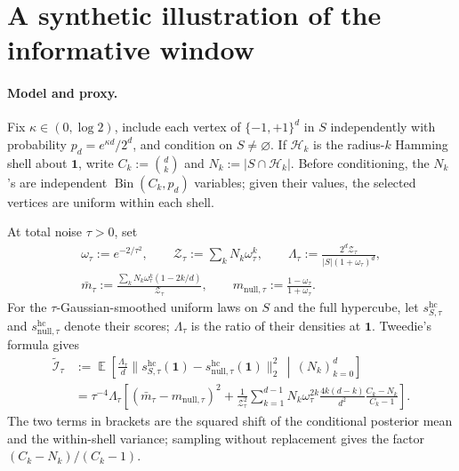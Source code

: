 \documentclass[11pt,letterpaper]{article}
\DeclareMathOperator*{\E}{\mathbb{E}}
\newcommand{\1}{\mathbbm{1}}
\begin{document}
\section{A synthetic illustration of the informative window}
\label{app:synthetic}

\paragraph{Model and proxy.}
Fix \(\kappa\in(0,\log2)\), include each vertex of \(\{-1,+1\}^d\)
in \(S\) independently with probability \(p_d=e^{\kappa d}/2^d\),
and condition on \(S\ne\varnothing\).  If \(\mathcal H_k\) is the
radius-\(k\) Hamming shell about \(\mathbf1\), write
\(C_k:=\binom dk\) and \(N_k:=|S\cap\mathcal H_k|\).
Before conditioning, the \(N_k\)'s are independent
\(\operatorname{Bin}(C_k,p_d)\) variables; given their values, the
selected vertices are uniform within each shell.

At total noise \(\tau>0\), set
\[
\begin{gathered}
   \omega_\tau:=e^{-2/\tau^2},\qquad
   \mathcal Z_\tau:=\sum_kN_k\omega_\tau^k,\qquad
   \Lambda_\tau:=
   \frac{2^d\mathcal Z_\tau}{|S|(1+\omega_\tau)^d},\\
   \bar m_\tau:=
   \frac{\sum_kN_k\omega_\tau^k(1-2k/d)}{\mathcal Z_\tau},
   \qquad
   m_{\mathrm{null},\tau}:=\frac{1-\omega_\tau}{1+\omega_\tau}.
\end{gathered}
\]
For the \(\tau\)-Gaussian-smoothed uniform laws on \(S\) and the full
hypercube, let \(s^{\mathrm{hc}}_{S,\tau}\) and
\(s^{\mathrm{hc}}_{\mathrm{null},\tau}\) denote their scores;
\(\Lambda_\tau\) is the ratio of their densities at \(\mathbf1\).
Tweedie's formula gives
\[
\begin{aligned}
   \widetilde{\mathcal I}_\tau
   &:=\E\!\left[
      \frac{\Lambda_\tau}{d}
      \|s^{\mathrm{hc}}_{S,\tau}(\mathbf 1)
        -s^{\mathrm{hc}}_{\mathrm{null},\tau}(\mathbf 1)\|_2^2
      \,\middle|\,(N_k)_{k=0}^d\right]\\
   &=\tau^{-4}\Lambda_\tau\left[
      (\bar m_\tau-m_{\mathrm{null},\tau})^2
      +\frac1{\mathcal Z_\tau^2}
       \sum_{k=1}^{d-1}N_k\omega_\tau^{2k}
       \frac{4k(d-k)}{d^2}
       \frac{C_k-N_k}{C_k-1}
   \right].
\end{aligned}
\]
The two terms in brackets are the squared shift of the conditional
posterior mean and the within-shell variance; sampling without
replacement gives the factor \((C_k-N_k)/(C_k-1)\).
\end{document}
